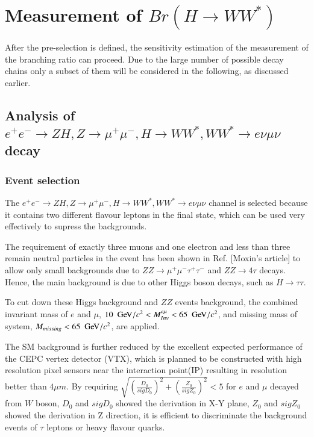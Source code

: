 \documentclass[11pt,a4paper]{cepcnote}
\begin{document}
\section{Measurement of $Br(H\rightarrow WW^*)$}
After the pre-selection is defined, the sensitivity estimation of
the measurement of the branching ratio can proceed. Due to the large number 
of possible decay chains only a subset of them will be considered in the
following, as discussed earlier.


\subsection{Analysis of $e^+e^-\rightarrow ZH, Z\rightarrow\mu^+\mu^-, H\rightarrow WW^*, WW^*\rightarrow e\nu\mu\nu$ decay}
\subsubsection{Event selection}
The $e^+e^-\rightarrow ZH, Z\rightarrow\mu^+\mu^-, H\rightarrow WW^*, WW^*\rightarrow e\nu\mu\nu$ channel is selected because it contains
two different flavour leptons in the final state, which can be used very
effectively to supress the backgrounds.

The requirement of exactly three muons and one electron {\color{blue}and less than three remain neutral particles} in the event has been
shown in Ref. {\color{red} [Moxin's article]} to allow only small backgrounds
due to $ZZ\rightarrow \mu^+\mu^-\tau^+\tau^-$ and $ZZ\rightarrow 4\tau$ decays.
Hence, the main background is due to other Higgs boson decays, such as $H\to\tau\tau$.

{\color{blue} To cut down these Higgs background and $ZZ$ events background, the combined invariant mass of $e$ and $\mu$, $10~\gev/c^2 < M_{Inv}^{e\mu} < 65~\gev/c^2$, and missing mass of system, $M_{missing} < 65~\gev/c^2$, are applied.}

The SM background is further reduced by the excellent expected performance
of the CEPC vertex detector (VTX), which is planned to be 
constructed with high resolution pixel sensors near the interaction point(IP) 
resulting in resolution better than $4\mu m$.
{\color{blue}By requiring $\sqrt{(\frac{D_{0}}{sigD_{0}})^2+(\frac{Z_{0}}{sigZ_{0}})^2} < 5$ for $e$ and $\mu$ decayed from $W$ boson, 
$D_0$ and $sigD_0$ showed the derivation in X-Y plane, $Z_0$ and $sigZ_0$ showed the derivation in Z direction,
it is efficient to discriminate the background events of $\tau$ leptons or heavy flavour quarks.}
\end{document}
